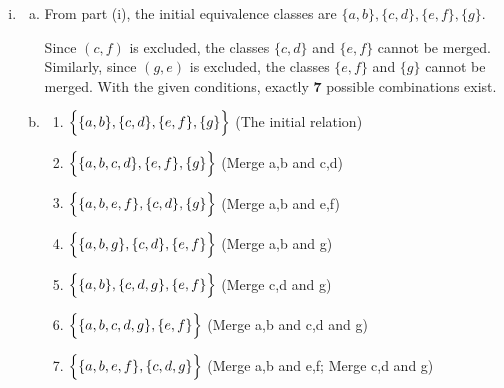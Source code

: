 \documentclass[12pt]{article}
\begin{document}
\begin{enumerate}[(i)]
\begin{enumerate}[1.]
\begin{enumerate}[-]
						\item Since $(e,f) \in Q$, and $(c,f) \not\in Q$; $(c,e) \not\in Q$

						\item Since $(c,d),(e,f) \in Q$, and $(c,f) \not\in Q$; $(d,e) \not\in
							Q$
					\end{enumerate}

				\item Since its an equivalence relation, it must be symmetric; therefore
					every known pair from (1.) MUST have a matching reverse pair included,
					and every known pair from (2.) and (4.) CANNOT have a matching reverse
					pairs included: $(b,a),(d,c),(f,e) \in Q$, and
					$(f,c),(e,g),(f,d),(e,c),(e,d) \not\in Q$

				\item Just like in (4.), because of transitivity, since $(e,f) \in Q$,
					and $(e,g) \not\in Q$; $(f,g) \not\in Q$; Also, just like in (5.),
					because of symmetry, $(g,f) \not\in Q$
			\end{enumerate}
			The remaining entries are left blank because the given facts cannot be used
			to definitively derive whether those pairs \textit{must} or \textit{cannot}
			be in Q.

		\item
			\begin{enumerate}[(a)]
				\item From part (i), the initial equivalence classes are
					$\{a,b\},\{c,d\},\{e,f\},\{g\}$.

					Since $(c,f)$ is excluded, the classes $\{c,d\}$ and $\{e,f\}$ cannot be
					merged. Similarly, since $(g,e)$ is excluded, the classes $\{e,f\}$
					and $\{g\}$ cannot be merged. With the given conditions, exactly
					\textbf{7} possible combinations exist.

				\item
					\begin{enumerate}[1.]
						\item $\Bigl\{ \{a,b\},\{c,d\},\{e,f\},\{g\} \Bigr\}$ (The initial
							relation)

						\item $\Bigl\{ \{a,b,c,d\},\{e,f\},\{g\} \Bigr\}$ (Merge a,b and c,d)

						\item $\Bigl\{ \{a,b,e,f\},\{c,d\},\{g\} \Bigr\}$ (Merge a,b and e,f)

						\item $\Bigl\{ \{a,b,g\},\{c,d\},\{e,f\} \Bigr\}$ (Merge a,b and g)

						\item $\Bigl\{ \{a,b\},\{c,d,g\},\{e,f\} \Bigr\}$ (Merge c,d and g)

						\item $\Bigl\{ \{a,b,c,d,g\},\{e,f\} \Bigr\}$ (Merge a,b and c,d and
							g)

						\item $\Bigl\{ \{a,b,e,f\},\{c,d,g\} \Bigr\}$ (Merge a,b and e,f; Merge
							c,d and g)
					\end{enumerate}
			\end{enumerate}
	\end{enumerate}
\end{document}
